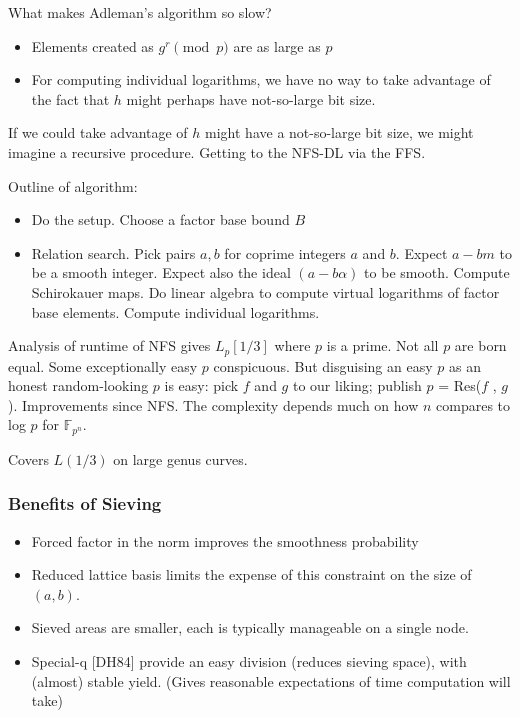 \documentclass[11pt]{article}
\begin{document}
What makes Adleman's algorithm so slow?

\begin{itemize}
	\item Elements created as $g^r \pmod p$ are as large as $p$
	\item For computing individual logarithms, we have no way to take advantage of the fact that $h$ might perhaps have not-so-large bit size.
\end{itemize}

If we could take advantage of $h$ might have a not-so-large bit size, we might imagine a recursive procedure. Getting to the NFS-DL via the FFS.

Outline of algorithm: 
\begin{itemize}
	\item Do the setup. Choose a factor base bound $B$ 
	\item Relation search. Pick pairs $a, b$ for coprime integers $a$ and $b$. Expect $a - bm$ to be a smooth integer. Expect also the ideal $(a-b\alpha)$ to be smooth. Compute Schirokauer maps. Do linear algebra to compute virtual logarithms of factor base elements. Compute individual logarithms.
\end{itemize}

Analysis of runtime of NFS gives $L_p[1/3]$ where $p$ is a prime. Not all $p$ are born equal. Some exceptionally easy $p$ conspicuous. But disguising an easy $p$ as an honest random-looking $p$ is easy: pick $f$ and $g$ to our liking; publish $p$ = Res($f$ , $g$ ). Improvements since NFS. The complexity depends much on how $n$ compares to log $p$ for $\mathbb{F}_{p^n}$.

Covers $L(1/3)$ on large genus curves.

\subsubsection{Benefits of Sieving}
\begin{itemize}
	\item Forced factor in the norm improves the smoothness probability
	\item Reduced lattice basis limits the expense of this constraint on the size of $(a,b)$.
	\item Sieved areas are smaller, each is typically manageable on a single node.
	\item Special-q [DH84] provide an easy division (reduces sieving space), with (almost) stable yield. (Gives reasonable expectations of time computation will take)
\end{itemize}
\end{document}
